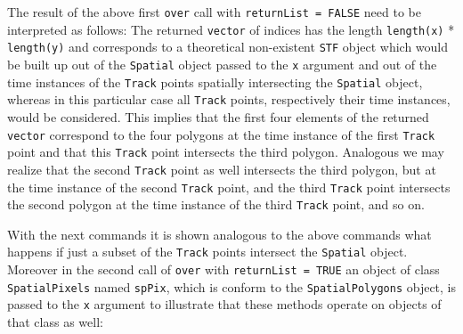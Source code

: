 \documentclass[12pt, oneside, a4paper]{scrbook}
\let\code=\texttt
\begin{document}
The result of the above first \code{over} call with \code{returnList = FALSE} need to be interpreted as follows: 
The returned \code{vector} of indices has the length \code{length(x)} * \code{length(y)} and corresponds to a theoretical non-existent \code{STF} object which would be built up out of the \code{Spatial} object passed to the \code{x} argument and out of the time instances of the \code{Track} points spatially intersecting the \code{Spatial} object, whereas in this particular case all \code{Track} points, respectively their time instances, would be considered.
This implies that the first four elements of the returned \code{vector} correspond to the four polygons at the time instance of the first \code{Track} point and that this \code{Track} point intersects the third polygon. 
Analogous we may realize that the second \code{Track} point as well intersects the third polygon, but at the time instance of the second \code{Track} point, and the third \code{Track} point intersects the second polygon at the time instance of the third \code{Track} point, and so on.
\par\medskip
With the next commands it is shown analogous to the above commands what happens if just a subset of the \code{Track} points intersect the \code{Spatial} object. 
Moreover in the second call of \code{over} with \code{returnList = TRUE} an object of class \code{SpatialPixels} named \code{spPix}, which is conform to the \code{SpatialPolygons} object, is passed to the \code{x} argument to illustrate that these methods operate on objects of that class as well:
\end{document}
